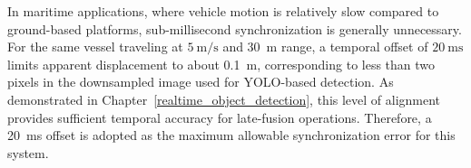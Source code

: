 \documentclass{erauthesis}
\begin{document}
In maritime applications, where vehicle motion is relatively slow compared to ground-based platforms, sub-millisecond synchronization is generally unnecessary.  
For the same vessel traveling at $5~\mathrm{m/s}$ and 30~m range, a temporal offset of $20~\mathrm{ms}$ limits apparent displacement to about 0.1~m, corresponding to less than two pixels in the downsampled image used for YOLO-based detection.  
As demonstrated in Chapter~\ref{realtime_object_detection}, this level of alignment provides sufficient temporal accuracy for late-fusion operations.
Therefore, a 20~ms offset is adopted as the maximum allowable synchronization error for this system.






\end{document}
